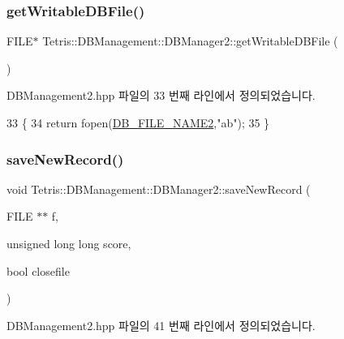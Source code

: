 \subsubsection{\texorpdfstring{get\+Writable\+D\+B\+File()}{getWritableDBFile()}}
{\footnotesize\ttfamily F\+I\+LE$\ast$ Tetris\+::\+D\+B\+Management\+::\+D\+B\+Manager2\+::get\+Writable\+D\+B\+File (\begin{DoxyParamCaption}{ }\end{DoxyParamCaption})\hspace{0.3cm}{\ttfamily [inline]}}



D\+B\+Management2.\+hpp 파일의 33 번째 라인에서 정의되었습니다.


\begin{DoxyCode}
33                                      \{
34                 \textcolor{keywordflow}{return} fopen(\hyperlink{_base_d_b_management_8hpp_a2ee22b58bca5e7989febcffafa7d017d}{DB\_FILE\_NAME2},\textcolor{stringliteral}{"ab"});
35             \}
\end{DoxyCode}
\mbox{\label{class_tetris_1_1_d_b_management_1_1_d_b_manager2_a25da0c1a6fa64b669f7e793c846961db}} 
\subsubsection{\texorpdfstring{save\+New\+Record()}{saveNewRecord()}}
{\footnotesize\ttfamily void Tetris\+::\+D\+B\+Management\+::\+D\+B\+Manager2\+::save\+New\+Record (\begin{DoxyParamCaption}\item[{F\+I\+LE $\ast$$\ast$}]{f,  }\item[{unsigned long long}]{score,  }\item[{bool}]{closefile }\end{DoxyParamCaption})\hspace{0.3cm}{\ttfamily [inline]}}



D\+B\+Management2.\+hpp 파일의 41 번째 라인에서 정의되었습니다.


